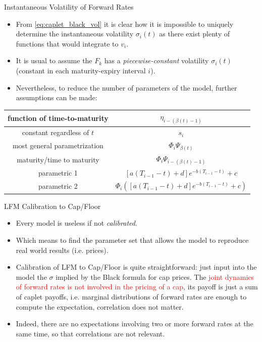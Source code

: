 \documentclass{beamer}
\begin{document}
\begin{frame}{Instantaneous Volatility of Forward Rates}
\begin{itemize}
	\item From \cref{eq:caplet_black_vol} it is clear how it is impossible to uniquely determine the instantaneous volatility $\sigma_i(t)$ as there exist plenty of functions that would integrate to $v_i$.
	\item It is usual to assume the $F_k$ has a \emph{piecewise-constant} volatility $\sigma_i(t)$ (constant in each maturity-expiry interval $i$).
	\item Nevertheless, to reduce the number of parameters of the model, further assumptions can be made:
\end{itemize}
\begin{center}
\begin{tabular}{|c|c|}
\hline
function of time-to-maturity & $\eta_{i-(\beta(t)-1)}$ \\ \hline
constant regardless of $t$ & $s_i$ \\ \hline
most general parametrization & $\Phi_i\Psi_{\beta(t)}$ \\ \hline
maturity/time to maturity & $\Phi_i\Psi_{i-(\beta(t)-1)}$ \\ \hline
parametric 1 & $[a(T_{i-1}-t) + d]e^{-b(T_{i-1}-t)} + c$ \\ \hline
parametric 2 & $\Phi_i\left([a(T_{i-1}-t) + d]e^{-b(T_{i-1}-t)} + c\right)$ \\ \hline
\end{tabular} 
\end{center}
\end{frame}

\begin{frame}{LFM Calibration to Cap/Floor}
	\begin{itemize}
		\item Every model is useless if not \emph{calibrated}.
		\item Which means to find the parameter set that allows the model to reproduce real world results (i.e. prices).
		\item Calibration of LFM to Cap/Floor is quite straightforward: just input into the model the $\sigma$ implied by the Black formula for cap prices.
		The \textcolor{red}{joint dynamics of forward rates is not involved in the pricing of a cap}, its payoff is just a sum of caplet payoffs, i.e. marginal distributions of forward rates are enough to compute the expectation, correlation does not matter. 
		\item Indeed, there are no expectations involving two or more forward rates at the same time, so that correlations are not relevant.
	\end{itemize}
\end{frame}
\end{document}
